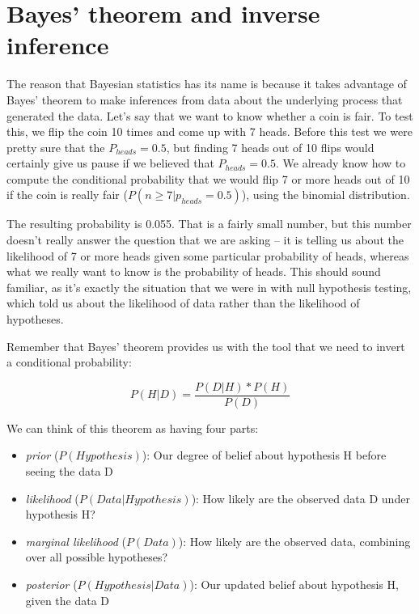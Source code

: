 \documentclass[12pt,]{book}
\providecommand{\tightlist}{%
  \setlength{\itemsep}{0pt}\setlength{\parskip}{0pt}}
\theoremstyle{definition}
\theoremstyle{definition}
\theoremstyle{definition}
\theoremstyle{remark}
\begin{document}
\hypertarget{bayes-theorem-and-inverse-inference}{%
\section{Bayes' theorem and inverse inference}\label{bayes-theorem-and-inverse-inference}}

The reason that Bayesian statistics has its name is because it takes advantage of Bayes' theorem to make inferences from data about the underlying process that generated the data. Let's say that we want to know whether a coin is fair. To test this, we flip the coin 10 times and come up with 7 heads. Before this test we were pretty sure that the \(P_{heads}=0.5\), but finding 7 heads out of 10 flips would certainly give us pause if we believed that \(P_{heads}=0.5\). We already know how to compute the conditional probability that we would flip 7 or more heads out of 10 if the coin is really fair (\(P(n\ge7|p_{heads}=0.5)\)), using the binomial distribution.

The resulting probability is 0.055. That is a fairly small number, but this number doesn't really answer the question that we are asking -- it is telling us about the likelihood of 7 or more heads given some particular probability of heads, whereas what we really want to know is the probability of heads. This should sound familiar, as it's exactly the situation that we were in with null hypothesis testing, which told us about the likelihood of data rather than the likelihood of hypotheses.

Remember that Bayes' theorem provides us with the tool that we need to invert a conditional probability:

\[
P(H|D) = \frac{P(D|H)*P(H)}{P(D)}
\]

We can think of this theorem as having four parts:

\begin{itemize}
\tightlist
\item
  \emph{prior} (\(P(Hypothesis)\)): Our degree of belief about hypothesis H before seeing the data D
\item
  \emph{likelihood} (\(P(Data|Hypothesis)\)): How likely are the observed data D under hypothesis H?
\item
  \emph{marginal likelihood} (\(P(Data)\)): How likely are the observed data, combining over all possible hypotheses?
\item
  \emph{posterior} (\(P(Hypothesis|Data)\)): Our updated belief about hypothesis H, given the data D
\end{itemize}
\end{document}
